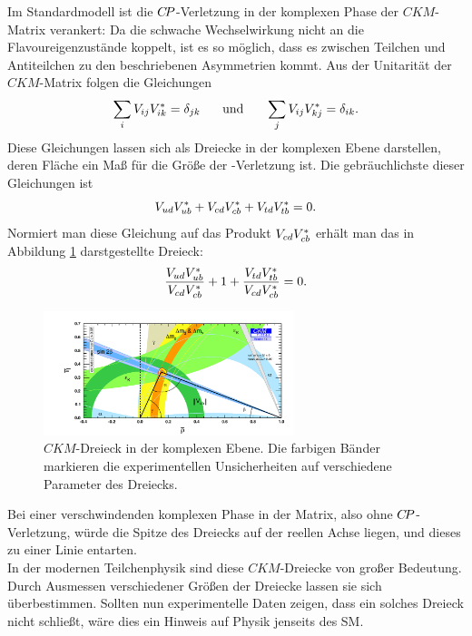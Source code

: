 Im Standardmodell ist die ${C\!P}$-Verletzung in der komplexen Phase der $C\!K\!M$-Matrix verankert: Da die schwache Wechselwirkung nicht an die Flavoureigenzustände koppelt, ist es so möglich, dass es zwischen Teilchen und Antiteilchen zu den beschriebenen Asymmetrien kommt. Aus der Unitarität der $C\!K\!M$-Matrix folgen die Gleichungen 
\begin{equation}
\sum_{i}V_{ij}V_{ik}^*=\delta_{jk} \hspace{0.5cm}\text{ und }\hspace{0.5cm} \sum_{j}V_{ij}V_{kj}^*=\delta_{ik}.
\end{equation}
Diese Gleichungen lassen sich als Dreiecke in der komplexen Ebene darstellen, deren Fläche ein Maß für die Größe der \CP-Verletzung ist. Die gebräuchlichste dieser Gleichungen ist
\begin{equation}
{\ensuremath{V_{{u}{d}}}}{\ensuremath{V^{*}_{{u}{b}}}}+{V_{{c}{d}}}{V^{*}_{{c}{b}}}+{V_{{t}{d}}}{V^{*}_{{t}{b}}}=0.
\end{equation}
Normiert man diese Gleichung auf das Produkt ${V_{{c}{d}}}{V^{*}_{{c}{b}}}$ erhält man das in Abbildung \ref{fig:ckm} darstgestellte Dreieck: 
\begin{equation}
\frac{{V_{{u}{d}}}{V^{*}_{{u}{b}}}}{{V_{{c}{d}}}{V^{*}_{{c}{b}}}}+1+\frac{{V_{{t}{d}}}{V^{*}_{{t}{b}}}}{{V_{{c}{d}}}{V^{*}_{{c}{b}}}}=0.
\end{equation}
\begin{figure}[htbp]
	\begin{center}
		\includegraphics[width=0.65\textwidth]{fig/ckm_fitter.pdf}
	\caption{$C\!K\!M$-Dreieck in der komplexen Ebene. Die farbigen Bänder markieren die experimentellen Unsicherheiten auf verschiedene Parameter des Dreiecks.\cite{ckm-fitter}}
	\label{fig:ckm}
 	\end{center}
\end{figure}
Bei einer verschwindenden komplexen Phase in der Matrix, also ohne ${C\!P}$-Verletzung, würde die Spitze des Dreiecks auf der reellen Achse liegen, und dieses zu einer Linie entarten.\\ 
In der modernen Teilchenphysik sind diese $C\!K\!M$-Dreiecke von großer Bedeutung. Durch Ausmessen verschiedener Größen der Dreiecke lassen sie sich überbestimmen. Sollten nun experimentelle Daten zeigen, dass ein solches Dreieck nicht schließt, wäre dies ein Hinweis auf Physik jenseits des SM.\\
